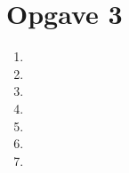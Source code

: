 \documentclass[12pt,a4paper]{article}
\begin{document}
\section{Opgave 3}
\begin{enumerate}
\item {}
\item {}
\item {}
\item {}
\item {}
\item {}
\item {}
\end{enumerate}
\end{document}
